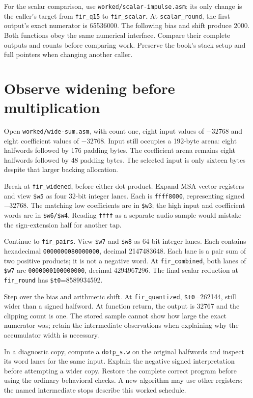 For the scalar comparison, use \texttt{worked/scalar-impulse.asm}; its only
change is the caller's target from \texttt{fir\_q15} to \texttt{fir\_scalar}.
At \texttt{scalar\_round}, the first output's exact numerator is 65536000.
The following bias and shift produce 2000. Both functions obey the same numerical
interface. Compare their complete outputs and counts before comparing work.
Preserve the book's stack setup and full pointers when changing another caller.

\section{Observe widening before multiplication}

Open \texttt{worked/wide-sum.asm}, with count one, eight input values of
$-32768$ and eight coefficient values of $-32768$. Input still occupies a
192-byte arena: eight halfwords followed by 176 padding bytes. The coefficient arena remains eight
halfwords followed by 48 padding bytes. The selected input is only sixteen
bytes despite that larger backing allocation.

Break at \texttt{fir\_widened}, before either dot product. Expand MSA vector
registers and view \texttt{\$w5} as four 32-bit integer lanes. Each is
\texttt{ffff8000}, representing signed $-32768$. The matching low coefficients
are in \texttt{\$w3}; the high input and coefficient words are in
\texttt{\$w6/\$w4}. Reading \texttt{ffff} as a separate audio sample would
mistake the sign-extension half for another tap.

Continue to \texttt{fir\_pairs}. View \texttt{\$w7} and \texttt{\$w8} as
64-bit integer lanes. Each contains hexadecimal \texttt{0000000080000000},
decimal 2147483648. Each lane is a pair sum of two positive products; it is not
a negative word. At \texttt{fir\_combined}, both lanes of \texttt{\$w7} are
\texttt{0000000100000000}, decimal 4294967296. The final scalar reduction at
\texttt{fir\_round} has \texttt{\$t0}=8589934592.



Step over the bias and arithmetic shift. At \texttt{fir\_quantized},
\texttt{\$t0}=262144, still wider than a signed halfword. At function return,
the output is 32767 and the clipping count is one. The stored sample cannot
show how large the exact numerator was; retain the intermediate observations
when explaining why the accumulator width is necessary.

In a diagnostic copy, compute a \texttt{dotp\_s.w} on the original halfwords
and inspect its word lanes for the same input. Explain the negative signed
interpretation before attempting a wider copy. Restore the complete correct
program before using the ordinary behavioral checks. A new algorithm may use
other registers; the named intermediate stops describe this worked schedule.

